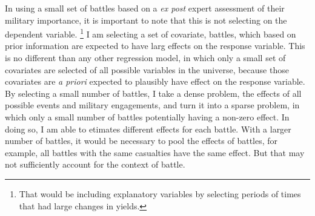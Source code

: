 In using a small set of battles based on a \textit{ex post} expert assessment of their military importance, it is important to note that this is not selecting on the dependent variable.%
\footnote{
  That would be including explanatory variables by selecting periods of times that had large changes in yields. 
}
I am selecting a set of covariate, battles, which based on prior information are expected to have larg effects on the response variable.
This is no different than any other regression model, in which only a small set of covariates are selected of all possible variables in the universe, because those covariates are \textit{a priori} expected to plausibly have effect on the response variable.
By selecting a small number of battles, I take a dense problem, the effects of all possible events and military engagements, and turn it into a sparse problem, in which only a small number of battles potentially having a non-zero effect.
In doing so, I am able to etimates different effects for each battle.
With a larger number of battles, it would be necessary to pool the effects of battles, for example, all battles with the same casualties have the same effect.
But that may not sufficiently account for the context of battle.

